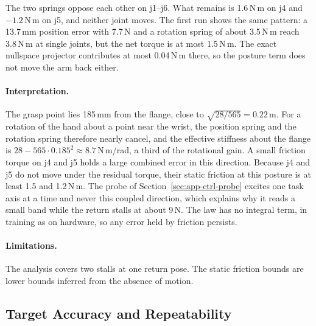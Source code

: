 The two springs oppose each other on j1--j6. What remains is 1.6\,N\,m on j4 and $-1.2$\,N\,m on j5, and neither joint moves. The first run shows the same pattern: a 13.7\,mm position error with 7.7\,N and a rotation spring of about 3.5\,N\,m reach 3.8\,N\,m at single joints, but the net torque is at most 1.5\,N\,m. The exact nullspace projector contributes at most 0.04\,N\,m there, so the posture term does not move the arm back either.

\paragraph{Interpretation.} The grasp point lies 185\,mm from the flange, close to $\sqrt{28/565}=0.22$\,m. For a rotation of the hand about a point near the wrist, the position spring and the rotation spring therefore nearly cancel, and the effective stiffness about the flange is $28-565\cdot0.185^2\approx8.7$\,N\,m/rad, a third of the rotational gain. A small friction torque on j4 and j5 holds a large combined error in this direction. Because j4 and j5 do not move under the residual torque, their static friction at this posture is at least 1.5 and 1.2\,N\,m. The probe of Section~\ref{sec:app-ctrl-probe} excites one task axis at a time and never this coupled direction, which explains why it reads a small band while the return stalls at about 9\,N. The law has no integral term, in training as on hardware, so any error held by friction persists.

\paragraph{Limitations.} The analysis covers two stalls at one return pose. The static friction bounds are lower bounds inferred from the absence of motion.

\subsection{Target Accuracy and Repeatability}\label{sec:app-ctrl-repeat}

